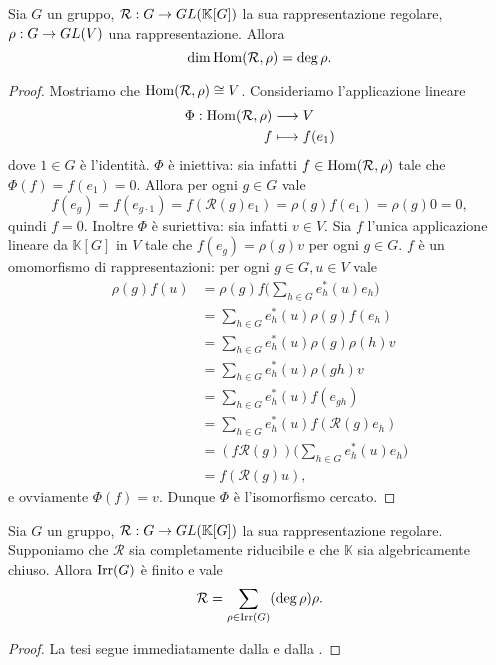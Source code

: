 \begin{proposition}
Sia $G$ un gruppo, $\mathcal{R}:G\to GL(\mathbb{K}[G])$ la sua rappresentazione regolare, $\rho:G\to GL(V)$ una rappresentazione. Allora 
$$
\dim\operatorname{Hom}(\mathcal{R},\rho)=\deg\rho.
$$
\end{proposition}
\begin{proof}
Mostriamo che $\operatorname{Hom}(\mathcal{R},\rho)\cong V$. Consideriamo l'applicazione lineare
\begin{align*}
\Phi:\operatorname{Hom}(\mathcal{R},\rho)&\longrightarrow V\\
f&\longmapsto f(e_1)
\end{align*}
dove $1\in G$ è l'identità. $\Phi$ è iniettiva: sia infatti $f\in\operatorname{Hom}(\mathcal{R},\rho)$ tale che $\Phi(f)=f(e_1)=0$. Allora per ogni $g\in G$ vale
$$
f(e_g)=f(e_{g\cdot1})=f(\mathcal{R}(g)e_1)=\rho(g)f(e_1)=\rho(g)0=0,
$$
quindi $f=0$. Inoltre $\Phi$ è suriettiva: sia infatti $v\in V$. Sia $f$ l'unica applicazione lineare da $\mathbb{K}[G]$ in $V$ tale che $f(e_g)=\rho(g)v$ per ogni $g\in G$. $f$ è un omomorfismo di rappresentazioni: per ogni $g\in G,u\in V$ vale
\begin{align*}
\rho(g)f(u)&=\rho(g)f\biggl(\sum_{h\in G}e_h^*(u)e_h\biggr)\\
&=\sum_{h\in G}e_h^*(u)\rho(g)f(e_h)\\
&=\sum_{h\in G}e_h^*(u)\rho(g)\rho(h)v\\
&=\sum_{h\in G}e_h^*(u)\rho(gh)v\\
&=\sum_{h\in G}e_h^*(u)f(e_{gh})\\
&=\sum_{h\in G}e_h^*(u)f(\mathcal{R}(g)e_h)\\
&=(f\mathcal{R}(g))\biggl(\sum_{h\in G}e_h^*(u)e_h\biggr)\\
&=f(\mathcal{R}(g)u),
\end{align*}
e ovviamente $\Phi(f)=v$. Dunque $\Phi$ è l'isomorfismo cercato.
\end{proof}

\begin{corollary}
Sia $G$ un gruppo, $\mathcal{R}:G\to GL(\mathbb{K}[G])$ la sua rappresentazione regolare. Supponiamo che $\mathcal{R}$ sia completamente riducibile e che $\mathbb{K}$ sia algebricamente chiuso. Allora $\operatorname{Irr}(G)$ è finito e vale
$$
\mathcal{R}=\sum_{\rho\in\operatorname{Irr}(G)}(\deg\rho)\rho.
$$
\end{corollary}
\begin{proof}
La tesi segue immediatamente dalla  e dalla .
\end{proof}

